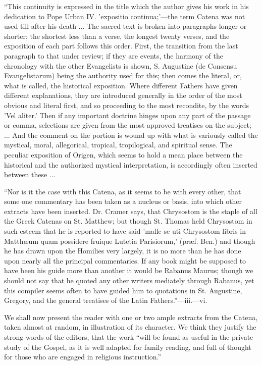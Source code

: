 ``This continuity is expressed
in the title which the author gives his work in his dedication to Pope
Urban IV. 'expositio continua;'—the term Catena was not used till
after his death ... The sacred text is broken into paragraphs longer or
shorter; the shortest less than a verse, the longest twenty verses, and
the exposition of each part follows this order. First, the transition
from the last paragraph to that under review; if they are events, the
harmony of the chronology with the other Evangelists is shown, S.
Augustine (de Consensu Evangelistarum) being the authority used for
this; then comes the literal, or, what is called, the historical
exposition. Where different Fathers have given different explanations,
they are introduced generally in the order of the most obvious and
literal first, and so proceeding to the most recondite, by the words 'Vel
aliter.' Then if any important doctrine hinges upon any part of the
passage or comma, selections are given from the most approved treatises
on the subject; ... And the comment on the portion is wound up with what
is variously called the mystical, moral, allegorical, tropical,
tropilogical, and spiritual sense. The peculiar exposition of Origen,
which seems to hold a mean place between the historical and the
authorized mystical interpretation, is accordingly often inserted
between these ...

``Nor is it the case with this
Catena, as it seems to be with every other, that some one commentary has
been taken as a nucleus or basis, into which other extracts have been
inserted. Dr. Cramer says, that Chrysostom is the staple of all the
Greek Catenas on St. Matthew; but though St. Thomas held Chrysostom in
such esteem that he is reported to have said 'malle se uti Chrysostom
libris in Matthæum quam possidere fruique Lutetia Parisiorum,' (præf.
Ben.) and though he has drawn upon the Homilies very largely, it is no
more than he has done upon nearly all the principal commentaries. If any
book might be supposed to have been his guide more than another it would
be Rabanus Maurus; though we should not say that he quoted any other
writers mediately through Rabanus, yet this compiler seems often to have
guided him to quotations in St. Augustine, Gregory, and the general
treatises of the Latin Fathers.''—iii.—vi.

We shall now present the reader with one or two
ample extracts from the Catena, taken almost at random, in illustration
of its character. We think they justify the strong words of the editors,
that the work ``will be found as useful in the private study of the
Gospel, as it is well adapted for family reading, and full of thought
for those who are engaged in religious instruction.''

